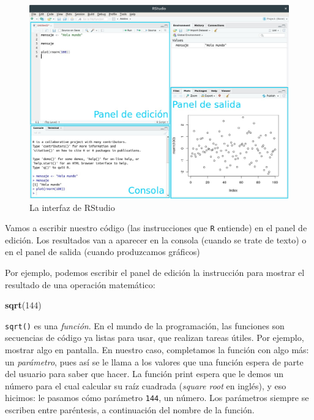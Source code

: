 \documentclass[]{book}
\newenvironment{Shaded}{\begin{snugshade}}{\end{snugshade}}
\newcommand{\KeywordTok}[1]{\textcolor[rgb]{0.13,0.29,0.53}{\textbf{#1}}}
\newcommand{\DecValTok}[1]{\textcolor[rgb]{0.00,0.00,0.81}{#1}}
\newcommand{\NormalTok}[1]{#1}
\begin{document}
\begin{figure}
\includegraphics[width=8.13in]{imagenes/Interfaz_RStudio} \caption{La interfaz de RStudio}\label{fig:unnamed-chunk-5}
\end{figure}

Vamos a escribir nuestro código (las instrucciones que \texttt{R}
entiende) en el panel de edición. Los resultados van a aparecer en la
consola (cuando se trate de texto) o en el panel de salida (cuando
produzcamos gráficos)

Por ejemplo, podemos escribir el panel de edición la instrucción para
mostrar el resultado de una operación matemático:

\begin{Shaded}
\begin{Highlighting}[]
\KeywordTok{sqrt}\NormalTok{(}\DecValTok{144}\NormalTok{)}
\end{Highlighting}
\end{Shaded}

\texttt{sqrt()} es una \emph{función}. En el mundo de la programación,
las funciones son secuencias de código ya listas para usar, que realizan
tareas útiles. Por ejemplo, mostrar algo en pantalla. En nuestro caso,
completamos la función con algo más: un \emph{parámetro}, pues así se le
llama a los valores que una función espera de parte del usuario para
saber que hacer. La función print espera que le demos un número para el
cual calcular su raíz cuadrada (\emph{square root} en inglés), y eso
hicimos: le pasamos cómo parámetro \texttt{144}, un número. Los
parámetros siempre se escriben entre paréntesis, a continuación del
nombre de la función.
\end{document}
